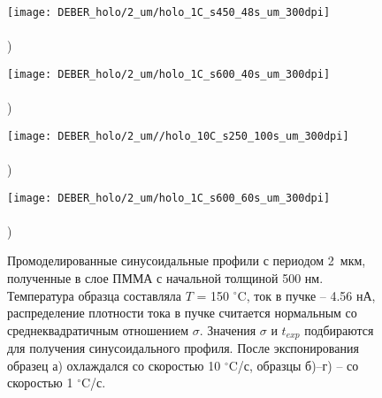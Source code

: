 \begin{figure}[t!]
	\begin{minipage}{0.48\textwidth}
		\texttt{[image: DEBER\_holo/2\_um/holo\_1C\_s450\_48s\_um\_300dpi]} \\
		\vspace{-13em} \\ ) \\ \vspace{13em}
	\end{minipage}
	\begin{minipage}{0.48\textwidth}
		\texttt{[image: DEBER\_holo/2\_um/holo\_1C\_s600\_40s\_um\_300dpi]} \\
		\vspace{-13em} \\ ) \\ \vspace{13em}
	\end{minipage}
	
	\vspace{-3.5em}
	
	\begin{minipage}{0.48\textwidth}
		\texttt{[image: DEBER\_holo/2\_um//holo\_10C\_s250\_100s\_um\_300dpi]} \\
		\vspace{-13em} \\ ) \\ \vspace{13em}
	\end{minipage}
	\begin{minipage}{0.48\textwidth}
		\texttt{[image: DEBER\_holo/2\_um/holo\_1C\_s600\_60s\_um\_300dpi]} \\
		\vspace{-13em} \\ ) \\ \vspace{13em}
	\end{minipage}
	\vspace{-3em}
	\caption{Промоделированные синусоидальные профили с периодом 2~мкм, полученные в слое ПММА с начальной толщиной 500 нм. Температура образца составляла $T$ = 150 $^\circ$C, ток в пучке -- 4.56 нА, распределение плотности тока в пучке считается нормальным со среднеквадратичным отношением $\sigma$. Значения $\sigma$ и $t_{exp}$ подбираются для получения синусоидального профиля. После экспонирования образец а) охлаждался со скоростью 10 $^\circ$C/с, образцы б)--г) -- со скоростью 1 $^\circ$C/с. 
	}
	\label{fig:DEBER_holo_2um}
\end{figure}


